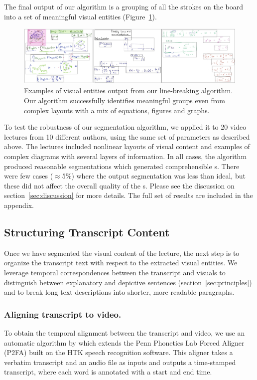 The final output of our algorithm is a grouping of all the strokes on the
board into a set of meaningful visual entities (Figure~\ref{Fig:visual_line_output}).
%
\begin{figure}[h!]
        \centering
        \includegraphics[width=\textwidth]{figures/visual-lines2.pdf}
        \captionsetup{font=footnotesize}
        \caption{Examples of visual entities output from our line-breaking algorithm.
Our algorithm successfully identifies meaningful groups even from complex
layouts with a mix of equations, figures and graphs.}
        \label{Fig:visual_line_output}
\end{figure}
%
To test the robustness of our segmentation algorithm, we applied it to 20 video lectures from 10 different authors, using the same set of parameters as described above. The lectures included nonlinear layouts of visual content and examples of complex diagrams with several layers of information. In all cases, the algorithm produced reasonable segmentations which generated comprehensible \systemname s. There were few cases ($\approx 5\%$) where the output segmentation was less than ideal, but these did not affect the overall quality of the \systemname s. Please see the discussion on section~\ref{sec:discussion} for more details. The full set of results are included in the appendix. 
\subsection{Structuring Transcript Content}
\label{sec:text_corr}

Once we have segmented the visual content of the lecture, the next step is to organize the transcript text with respect to the extracted visual entities.
We leverage temporal correspondences between the transcript and visuals to distinguish between explanatory and depictive sentences (section~\ref{sec:principles}) and to break long text descriptions into shorter, more readable paragraphs.

\subsubsection{Aligning transcript to video.} 
To obtain the temporal alignment between the transcript and video, we use an automatic algorithm by \cite{rubin2013content} which extends the Penn Phonetics Lab Forced Aligner (P2FA) built on the HTK speech recognition software. This   aligner takes a verbatim transcript and an audio file as inputs and outputs a time-stamped transcript, where each word is annotated with a start and end time. 

